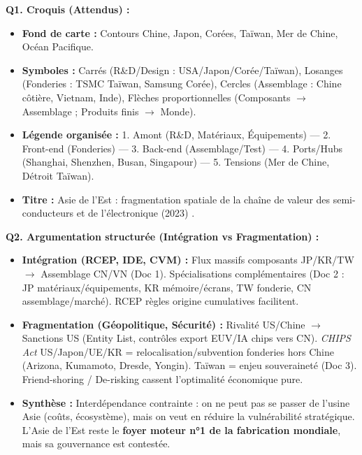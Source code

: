 \documentclass[11pt]{article}
\begin{document}
\begin{corrige}[Exercice n°13-4]
\textbf{Q1. Croquis (Attendus) :}
\begin{itemize}
    \item \textbf{Fond de carte :} Contours Chine, Japon, Corées, Taïwan, Mer de Chine, Océan Pacifique.
    \item \textbf{Symboles :} Carrés (R\&D/Design : USA/Japon/Corée/Taïwan), Losanges (Fonderies : TSMC Taïwan, Samsung Corée), Cercles (Assemblage : Chine côtière, Vietnam, Inde), Flèches proportionnelles (Composants $\rightarrow$ Assemblage ; Produits finis $\rightarrow$ Monde).
    \item \textbf{Légende organisée :} 1. Amont (R\&D, Matériaux, Équipements) — 2. Front-end (Fonderies) — 3. Back-end (Assemblage/Test) — 4. Ports/Hubs (Shanghai, Shenzhen, Busan, Singapour) — 5. Tensions (Mer de Chine, Détroit Taïwan).
    \item \textbf{Titre :} \og Asie de l'Est : fragmentation spatiale de la chaîne de valeur des semi-conducteurs et de l'électronique (2023) \fg.
\end{itemize}
\textbf{Q2. Argumentation structurée (Intégration vs Fragmentation) :}
\begin{itemize}
    \item \textbf{Intégration (RCEP, IDE, CVM) :} Flux massifs composants JP/KR/TW $\rightarrow$ Assemblage CN/VN (Doc 1). Spécialisations complémentaires (Doc 2 : JP matériaux/équipements, KR mémoire/écrans, TW fonderie, CN assemblage/marché). RCEP règles origine cumulatives facilitent.
    \item \textbf{Fragmentation (Géopolitique, Sécurité) :} Rivalité US/Chine $\rightarrow$ Sanctions US (Entity List, contrôles export EUV/IA chips vers CN). \emph{CHIPS Act} US/Japon/UE/KR = relocalisation/subvention fonderies hors Chine (Arizona, Kumamoto, Dresde, Yongin). Taïwan = enjeu souveraineté (Doc 3). \og Friend-shoring \fg / \og De-risking \fg cassent l'optimalité économique pure.
    \item \textbf{Synthèse :} \og Interdépendance contrainte \fg : on ne peut pas se passer de l'usine Asie (coûts, écosystème), mais on veut en réduire la vulnérabilité stratégique. L'Asie de l'Est reste le \textbf{foyer moteur n°1 de la fabrication mondiale}, mais sa gouvernance est contestée.
\end{itemize}
\end{corrige}
\end{document}
